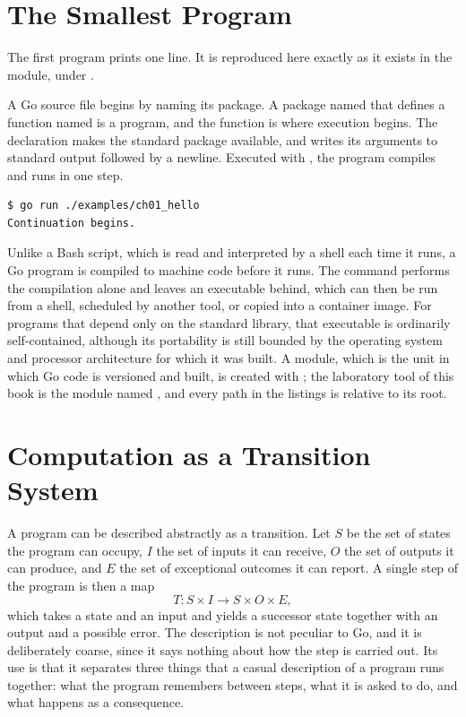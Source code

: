 \section{The Smallest Program}

The first program prints one line. It is reproduced here exactly as it exists in the \golab{} module, under .


A Go source file begins by naming its package. A package named  that defines a function named  is a program, and the function is where execution begins. The  declaration makes the standard package  available, and  writes its arguments to standard output followed by a newline. Executed with , the program compiles and runs in one step.

\begin{lstlisting}[style=shellstyle,caption={Running the minimal program.}]
$ go run ./examples/ch01_hello
Continuation begins.
\end{lstlisting}

Unlike a Bash script, which is read and interpreted by a shell each time it runs, a Go program is compiled to machine code before it runs. The  command performs the compilation alone and leaves an executable behind, which can then be run from a shell, scheduled by another tool, or copied into a container image. For programs that depend only on the standard library, that executable is ordinarily self-contained, although its portability is still bounded by the operating system and processor architecture for which it was built. A module, which is the unit in which Go code is versioned and built, is created with ; the laboratory tool of this book is the module named , and every path in the listings is relative to its root.

\section{Computation as a Transition System}

A program can be described abstractly as a transition. Let $S$ be the set of states the program can occupy, $I$ the set of inputs it can receive, $O$ the set of outputs it can produce, and $E$ the set of exceptional outcomes it can report. A single step of the program is then a map
\[
T : S \times I \longrightarrow S \times O \times E,
\]
which takes a state and an input and yields a successor state together with an output and a possible error. The description is not peculiar to Go, and it is deliberately coarse, since it says nothing about how the step is carried out. Its use is that it separates three things that a casual description of a program runs together: what the program remembers between steps, what it is asked to do, and what happens as a consequence.

